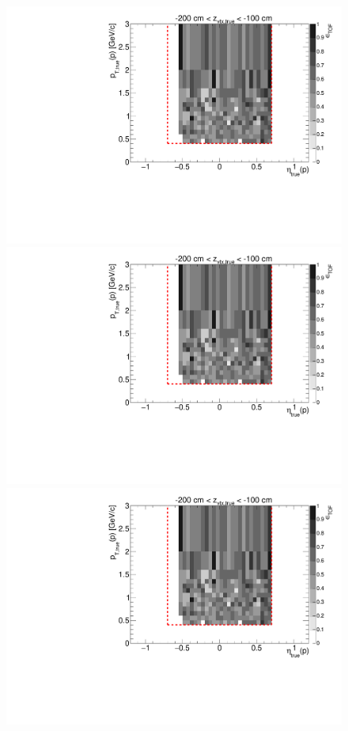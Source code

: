 \begin{figure}[hb]\ContinuedFloat
\centering
\parbox{0.495\textwidth}{
  \centering
  \includegraphics[width=\linewidth,page=11]{graphics/eff/Eff2D_TOF_proton_Plus.pdf}\\
  \includegraphics[width=\linewidth,page=13]{graphics/eff/Eff2D_TOF_proton_Plus.pdf}\\
  \includegraphics[width=\linewidth,page=15]{graphics/eff/Eff2D_TOF_proton_Plus.pdf}\\
}
\end{figure}
